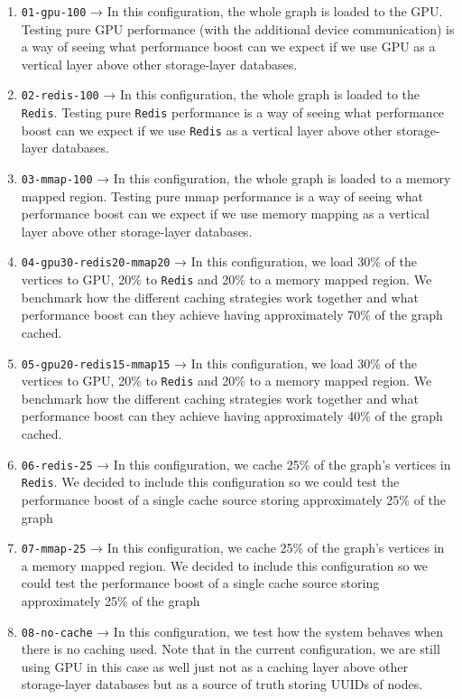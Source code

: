 \documentclass[11pt,a4paper]{article}
\begin{document}
\begin{enumerate}
    \item \texttt{01-gpu-100} → In this configuration, the whole graph is loaded to the GPU. Testing pure GPU performance (with the additional device communication) is a way of seeing what performance boost can we expect if we use GPU as a vertical layer above other storage-layer databases.

    \item \texttt{02-redis-100} → In this configuration, the whole graph is loaded to the \texttt{Redis}. Testing pure \texttt{Redis} performance is a way of seeing what performance boost can we expect if we use \texttt{Redis} as a vertical layer above other storage-layer databases.
 
     \item \texttt{03-mmap-100} → In this configuration, the whole graph is loaded to a memory mapped region. Testing pure mmap performance is a way of seeing what performance boost can we expect if we use memory mapping as a vertical layer above other storage-layer databases.
 
     \item \texttt{04-gpu30-redis20-mmap20} → In this configuration, we load 30\% of the vertices to GPU, 20\% to \texttt{Redis} and 20\% to a memory mapped region. We benchmark how the different caching strategies work together and what performance boost can they achieve having approximately 70\% of the graph cached.

    \item \texttt{05-gpu20-redis15-mmap15} → In this configuration, we load 30\% of the vertices to GPU, 20\% to \texttt{Redis} and 20\% to a memory mapped region. We benchmark how the different caching strategies work together and what performance boost can they achieve having approximately 40\% of the graph cached.

    \item \texttt{06-redis-25} → In this configuration, we cache 25\% of the graph's vertices in \texttt{Redis}. We decided to include this configuration so we could test the performance boost of a single cache source storing approximately 25\% of the graph

    \item \texttt{07-mmap-25} → In this configuration, we cache 25\% of the graph's vertices in a memory mapped region. We decided to include this configuration so we could test the performance boost of a single cache source storing approximately 25\% of the graph
    
    \item \texttt{08-no-cache} → In this configuration, we test how the system behaves when there is no caching used. Note that in the current configuration, we are still using GPU in this case as well just not as a caching layer above other storage-layer databases but as a source of truth storing UUIDs of nodes.
\end{enumerate}
\end{document}
